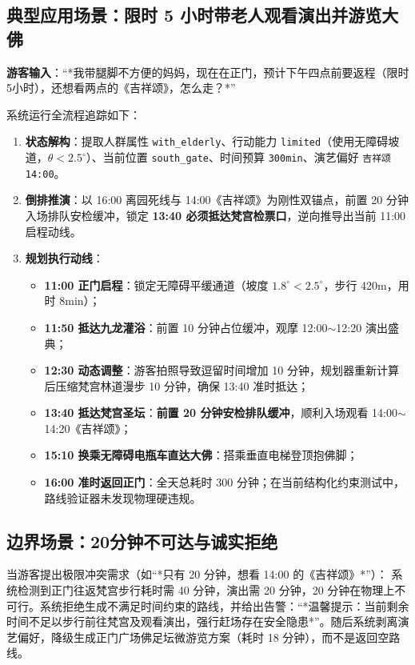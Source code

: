 \documentclass[11pt,a4paper]{ctexart}
\begin{document}
\subsection{典型应用场景：限时 5 小时带老人观看演出并游览大佛}
\textbf{游客输入}：“*我带腿脚不方便的妈妈，现在在正门，预计下午四点前要返程（限时5小时），还想看两点的《吉祥颂》，怎么走？*”

系统运行全流程追踪如下：
\begin{enumerate}
    \item \textbf{状态解构}：提取人群属性 \texttt{with\_elderly}、行动能力 \texttt{limited}（使用无障碍坡道，$\theta < 2.5^\circ$）、当前位置 \texttt{south\_gate}、时间预算 \texttt{300min}、演艺偏好 \texttt{吉祥颂 14:00}。
    \item \textbf{倒排推演}：以 16:00 离园死线与 14:00《吉祥颂》为刚性双锚点，前置 20 分钟入场排队安检缓冲，锁定 \textbf{13:40 必须抵达梵宫检票口}，逆向推导出当前 11:00 启程动线。
    \item \textbf{规划执行动线}：
    \begin{itemize}[noitemsep]
        \item \textbf{11:00 正门启程}：锁定无障碍平缓通道（坡度 $1.8^\circ < 2.5^\circ$，步行 420m，用时 8min）；
        \item \textbf{11:50 抵达九龙灌浴}：前置 10 分钟占位缓冲，观摩 12:00$\sim$12:20 演出盛典；
        \item \textbf{12:30 动态调整}：游客拍照导致逗留时间增加 10 分钟，规划器重新计算后压缩梵宫林道漫步 10 分钟，确保 13:40 准时抵达；
        \item \textbf{13:40 抵达梵宫圣坛}：\textbf{前置 20 分钟安检排队缓冲}，顺利入场观看 14:00$\sim$14:20《吉祥颂》；
        \item \textbf{15:10 换乘无障碍电瓶车直达大佛}：搭乘垂直电梯登顶抱佛脚；
         \item \textbf{16:00 准时返回正门}：全天总耗时 300 分钟；在当前结构化约束测试中，路线验证器未发现物理硬违规。
    \end{itemize}
\end{enumerate}

\subsection{边界场景：20分钟不可达与诚实拒绝}
当游客提出极限冲突需求（如“*只有 20 分钟，想看 14:00 的《吉祥颂》*”）：
系统检测到正门往返梵宫步行耗时需 40 分钟，演出需 20 分钟，20 分钟在物理上不可行。系统拒绝生成不满足时间约束的路线，并给出告警：“*温馨提示：当前剩余时间不足以步行前往梵宫及观看演出，强行赶场存在安全隐患*”。随后系统剥离演艺偏好，降级生成正门广场佛足坛微游览方案（耗时 18 分钟），而不是返回空路线。
\end{document}
